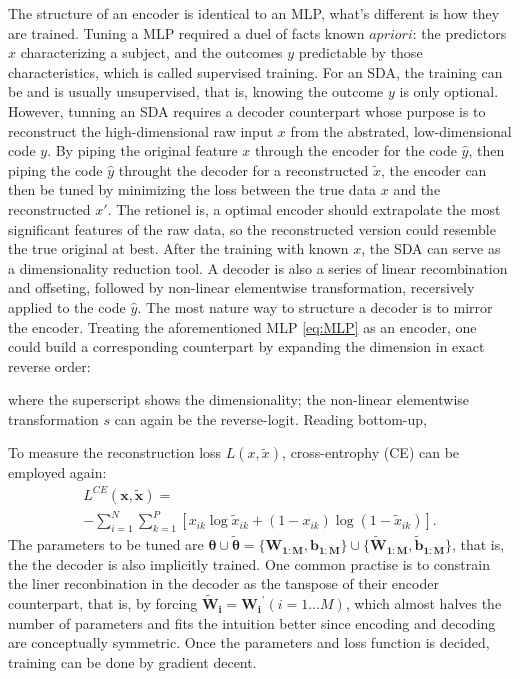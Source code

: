 The structure of an encoder is identical to an MLP, what's different is how they are trained. Tuning a MLP required a duel of facts known $a priori$: the predictors $x$ characterizing a subject, and the outcomes $y$ predictable by those characteristics, which is called supervised training. For an SDA, the training can be and is usually unsupervised, that is, knowing the outcome $y$ is only optional. However, tunning an SDA requires a decoder counterpart whose purpose is to reconstruct the  high-dimensional raw input $x$ from the abstrated, low-dimensional code $y$. By piping the original feature $x$ through the encoder for the code $\hat{y}$, then piping the code $\hat{y}$ throught the decoder for a reconstructed $\tilde{x}$, the encoder can then be tuned by minimizing the loss between the true data $x$ and the reconstructed $x'$. The retionel is, a optimal encoder should extrapolate the most significant features of the raw data, so the reconstructed version could resemble the true original at best. After the training with known $x$, the SDA can serve as a dimensionality reduction tool.
A decoder is also a series of linear recombination and offseting, followed by non-linear elementwise transformation, recersively applied to the code $\hat{y}$. The most nature way to structure a decoder is to mirror the encoder. Treating the aforementioned MLP \ref{eq:MLP} as an encoder, one could build a corresponding counterpart by expanding the dimension in exact reverse order:

where the superscript shows the dimensionality; the non-linear elementwise transformation $s$ can again be the reverse-logit. Reading bottom-up, 

To measure the reconstruction loss $L(x,\tilde{x})$, cross-entrophy (CE) can be employed again:
\begin{equation*}
\begin{split}
  L^{CE}(\boldsymbol{x},\boldsymbol{\tilde{x}}) = \\
  -\sum_{i=1}^N\sum_{k=1}^P[x_{ik}\log{\tilde{x}_{ik}}+(1-x_{ik})\log(1-\tilde{x}_{ik})].
\end{split}
\end{equation*}
The parameters to be tuned are $\boldsymbol{\theta} \cup \boldsymbol{\tilde{\theta}}=\{\boldsymbol{W_{1:M}},\boldsymbol{b_{1:M}}\} \cup \{\boldsymbol{\tilde{W}_{1:M}}, \boldsymbol{\tilde{b}_{1:M}}\}$, that is, the the decoder is also implicitly trained. One common practise is to constrain the liner reconbination in the decoder as the tanspose of their encoder counterpart, that is, by forcing $\boldsymbol{\tilde{W}_i}=\boldsymbol{W_i}^{\prime} (i=1 \ldots M)$, which almost halves the number of parameters and fits the intuition better since encoding and decoding are conceptually symmetric. Once the parameters and loss function is decided, training can be done by gradient decent.

